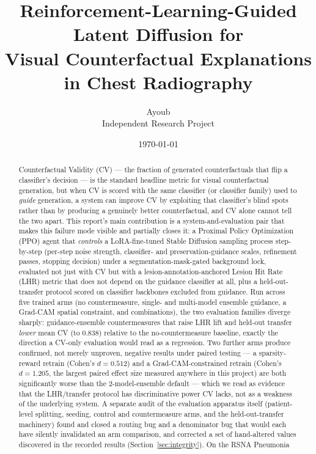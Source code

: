 \documentclass[11pt]{article}
\title{\textbf{Reinforcement-Learning-Guided Latent Diffusion for\\
Visual Counterfactual Explanations in Chest Radiography}}
\author{Ayoub \\ \small Independent Research Project}
\date{\today}
\begin{document}
\maketitle

\begin{abstract}
Counterfactual Validity (CV) — the fraction of generated counterfactuals
that flip a classifier's decision — is the standard headline metric for
visual counterfactual generation, but when CV is scored with the same
classifier (or classifier family) used to \emph{guide} generation, a
system can improve CV by exploiting that classifier's blind spots rather
than by producing a genuinely better counterfactual, and CV alone cannot
tell the two apart. This report's main contribution is a
system-and-evaluation pair that makes this failure mode visible and
partially closes it: a Proximal Policy Optimization (PPO) agent that
\emph{controls} a LoRA-fine-tuned Stable Diffusion sampling process
step-by-step (per-step noise strength, classifier- and
preservation-guidance scales, refinement passes, stopping decision) under
a segmentation-mask-gated background lock, evaluated not just with CV but
with a lesion-annotation-anchored Lesion Hit Rate (LHR) metric that does
not depend on the guidance classifier at all, plus a held-out-transfer
protocol scored on classifier backbones excluded from guidance. Run
across five trained arms (no countermeasure, single- and multi-model
ensemble guidance, a Grad-CAM spatial constraint, and combinations), the
two evaluation families diverge sharply: guidance-ensemble countermeasures
that raise LHR lift and held-out transfer \emph{lower} mean CV (to
$0.838$) relative to the no-countermeasure baseline, exactly the direction
a CV-only evaluation would read as a regression. Two further arms produce
confirmed, not merely unproven, negative results under paired testing — a
sparsity-reward retrain (Cohen's $d=0.512$) and a Grad-CAM-constrained
retrain (Cohen's $d=1.205$, the largest paired effect size measured
anywhere in this project) are both significantly worse than the
2-model-ensemble default — which we read as evidence that the LHR/transfer
protocol has discriminative power CV lacks, not as a weakness of the
underlying system. A separate audit of the evaluation apparatus itself
(patient-level splitting, seeding, control and countermeasure arms, and
the held-out-transfer machinery) found and closed a routing bug and a
denominator bug that would each have silently invalidated an arm
comparison, and corrected a set of hand-altered values discovered in the
recorded results (Section~\ref{sec:integrity}). On the RSNA Pneumonia

\end{abstract}
\end{document}
